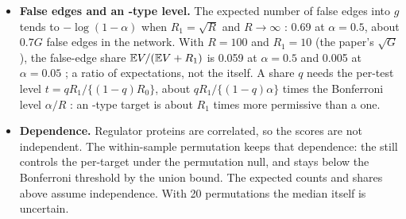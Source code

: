 \documentclass[11pt,a4paper]{article}
\begin{document}
\begin{methodbox}[title={Where the two levels come from, and what they control (our reading)}]
\begin{itemize}
        threshold $\sigma\Phi^{-1}\{1-\alpha/(2R)\}$, whatever the dependence between scores. Under
        independence it is the Šidák threshold, with per-test level $1-(1-\alpha)^{1/R}\ge\alpha/R$
        . Both thresholds grow as $\sigma\sqrt{2\log R}$ and their ratio tends to 1 : at
        $R=100$ it is 0.998 for $\alpha=0.05$ and 0.962 for $\alpha=0.5$. The per-test levels differ by the
        factor $-\log(1-\alpha)/\alpha$, 1.03 at $\alpha=0.05$ and 1.39 at $\alpha=0.5$ .
  \item \textbf{False edges and an -type level.} The expected number of false edges into
        $g$ tends to $-\log(1-\alpha)$ when $R_1=\sqrt R$ and $R\to\infty$ : 0.69 at $\alpha=0.5$,
        about $0.7G$ false edges in the network. With $R=100$ and $R_1=10$ (the paper's $\sqrt G$), the
        false-edge share $\mathbb{E} V/(\mathbb{E} V+R_1)$ is 0.059 at $\alpha=0.5$ and 0.005 at $\alpha=0.05$ ; a
        ratio of expectations, not the  itself. A share $q$ needs the per-test level
        $t=qR_1/\{(1-q)R_0\}$, about $qR_1/\{(1-q)\alpha\}$ times the Bonferroni level $\alpha/R$ :
        an -type target is about $R_1$ times more permissive than a  one.
  \item \textbf{Dependence.} Regulator proteins are correlated, so the scores are not independent. The
        within-sample permutation keeps that dependence: the  still controls the per-target
         under the permutation null, and stays below the Bonferroni threshold by the union
        bound. The expected counts and shares above assume independence. With 20 permutations the median
        itself is uncertain.
\end{itemize}
\end{methodbox}
\end{document}
